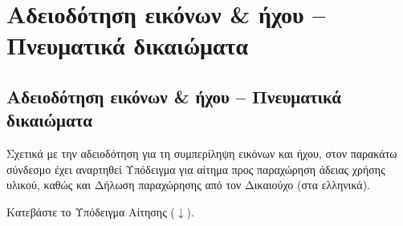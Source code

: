 \chapter{Αδειοδότηση εικόνων \& ήχου – Πνευματικά δικαιώματα }\label{chap:ip-rights}

\section{Αδειοδότηση εικόνων \& ήχου – Πνευματικά δικαιώματα}

Σχετικά με την αδειοδότηση για τη συμπερίληψη εικόνων και ήχου, στον παρακάτω
σύνδεσμο έχει αναρτηθεί Υπόδειγμα για αίτημα προς παραχώρηση άδειας χρήσης υλικού,
καθώς και Δήλωση παραχώρησης από τον Δικαιούχο (στα ελληνικά).

Κατεβάστε το Υπόδειγμα Αίτησης (\href{https://www.kallipos.gr/images/kalliposplus/A4/Ypodeigma\_Epistoli\_gia\_lipsi\_adeias\_xrisis\_ylikou.docx}{$\downarrow$}).
